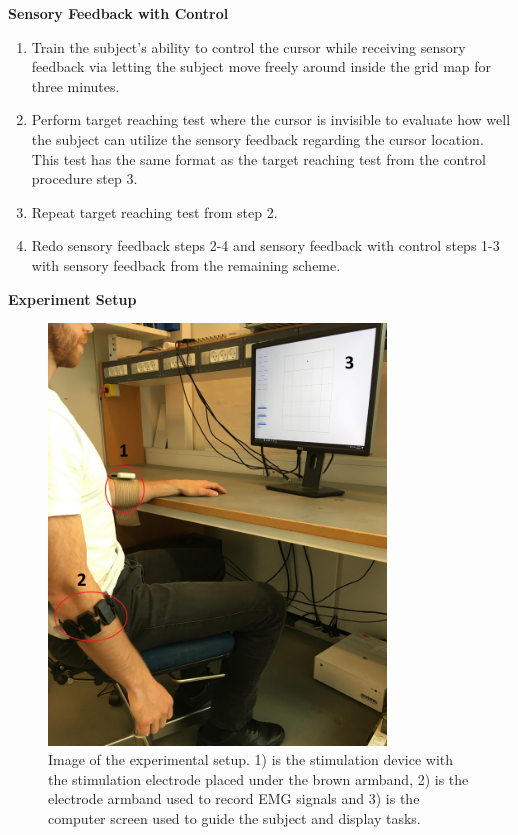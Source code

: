 \noindent\textbf{Sensory Feedback with Control} \\
\vspace{-5pt}

\begin{enumerate}
	\item Train the subject's ability to control the cursor while receiving sensory feedback via letting the subject move freely around inside the grid map for three minutes.
	\item Perform target reaching test where the cursor is invisible to evaluate how well the subject can utilize the sensory feedback regarding the cursor location. This test has the same format as the target reaching test from the control procedure step 3.
	\item Repeat target reaching test from step 2.
	\item Redo sensory feedback steps 2-4 and sensory feedback with control steps 1-3 with sensory feedback from the remaining scheme.
\end{enumerate}


\newpage
\noindent\textbf{{\Large Experiment Setup}} \\

\begin{figure}[H]                 
	\includegraphics[width=0.8\textwidth]{figures/setupimg}  
	\caption{Image of the experimental setup. 1) is the stimulation device with the stimulation electrode placed under the brown armband, 2) is the electrode armband used to record EMG signals and 3) is the computer screen used to guide the subject and display tasks.} 
	\label{fig:setup} 
\end{figure}

